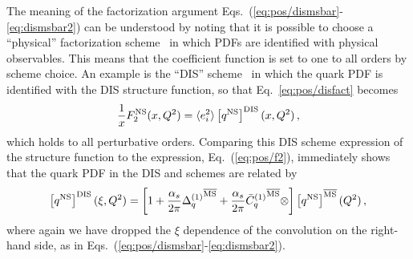 The  meaning of the factorization argument
Eqs.~(\ref{eq:pos/dismsbar}-\ref{eq:dismsbar2}) can be understood by
noting
that it is possible to choose a ``physical'' factorization
scheme~\cite{Catani:1995ze} in which PDFs are identified with physical
observables. This means that the coefficient function is set to one to
all orders by scheme choice. An example is the ``DIS'' scheme~\cite{Diemoz:1987xu} in which
the quark PDF is identified with the DIS structure function, so that
Eq.~\ref{eq:pos/disfact} becomes
\begin{equation}\label{eq:pos/disfactns}
 \frac{1}{x} F_2^{{\textrm{NS}}}(x,Q^2)= \langle e_i^2\rangle  \left[{q^{{\textrm{NS}}}}\right]^{\textrm{DIS}}(x,Q^2) \,,
 \end{equation}
which holds to all perturbative orders. Comparing this DIS scheme
expression of the structure function to the \msbar{} expression,
Eq.~(\ref{eq:pos/f2}), immediately shows that the quark PDF in the DIS
and \msbar{} schemes are related by
\begin{equation}\label{eq:pos/msbartodis}
\left[{q^{{\textrm{NS}}}}\right]^{\textrm{DIS}}(\xi,Q^2)=
\left[1+\frac{\alpha_s}{2\pi} {\Delta^{(1)}_q}^{{\overline{\textrm{MS}}}}
  +\frac{\alpha_s}{2\pi}
  {{{\bar{C}}^{(1)}}_q{}}^{{\overline{\textrm{MS}}}}\otimes\right]\left[{q^{{\textrm{NS}}}}\right]^{{\overline{\textrm{MS}}}}(Q^2) \,,
\end{equation}
where again we have dropped the $\xi$ dependence of the convolution
on the right-hand side,
as in Eqs.~(\ref{eq:pos/dismsbar}-\ref{eq:dismsbar2}).

